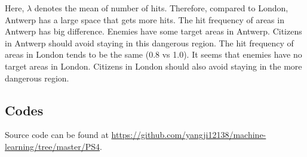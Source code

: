 \documentclass[12pt]{myarticle}
\begin{document}
Here, $\lambda$ denotes the mean of number of hits. Therefore, compared to London, Antwerp has a large space that gets more hits. The hit frequency of areas in Antwerp has big difference. Enemies have some target areas in Antwerp. Citizens in Antwerp should avoid staying in this dangerous region. The hit frequency of areas in London tends to be the same (0.8 vs 1.0). It seems that enemies have no target areas in London. Citizens in London should also avoid staying in the more dangerous region.

\subsection*{Codes}

Source code can be found at \url{https://github.com/yangji12138/machine-learning/tree/master/PS4}.










\end{document}
